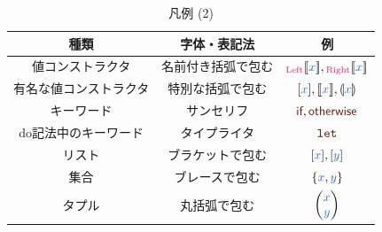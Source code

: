 \documentclass[a5paper,twoside,fleqn,draft]{jsbook}
\begin{document}
\begin{table}[p]
\caption{凡例 (2)}
\begin{center}
\begin{tabular}{||c|c|c||}
\hline
種類&字体・表記法&例\\
\hline\hline
値コンストラクタ&名前付き括弧で包む&$\hLeftWith{\hVar{x}},\hRightWith{\hVar{x}}$\\
有名な値コンストラクタ&特別な括弧で包む&$\hListWith{\hVar{x}},\hPureWith{\hVar{x}},\hReturnWith{\hVar{x}}$\\
\hline
キーワード&サンセリフ&$\hIf,\hOtherwise$\\
do記法中のキーワード&タイプライタ&$\hDoLet$\\
\hline
リスト&ブラケットで包む&$\hListWith{\hVar{x}},\hListWith{\hVar{y}}$\\
集合&ブレースで包む&$\{\hVar{x},\hVar{y}\}$\\
タプル&丸括弧で包む&$\hPairWith{\hVar{x}}{\hVar{y}}$\\
\hline
\end{tabular}
\end{center}
\end{table}
\end{document}
